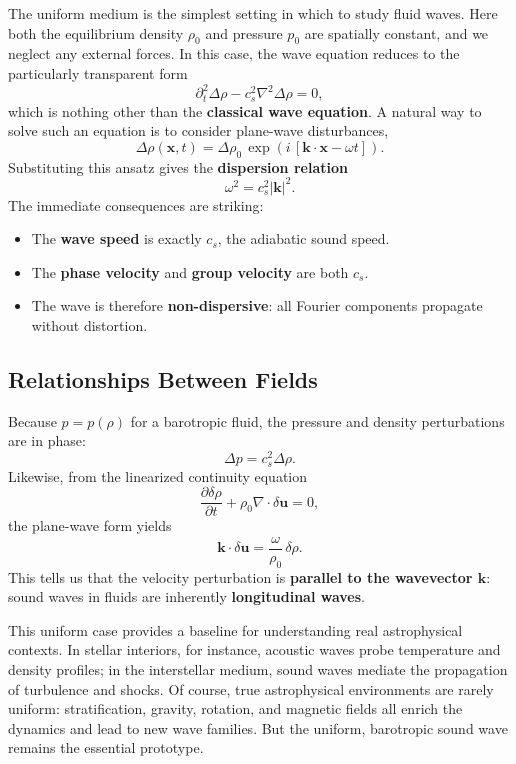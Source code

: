 The uniform medium is the simplest setting in which to study fluid waves.  Here both the equilibrium density $\rho_0$ and pressure $p_0$ are spatially constant, and we neglect any external forces. In this case, the wave equation 
reduces to the particularly transparent form
\[
\partial_t^2 \Delta \rho - c_s^2 \nabla^2 \Delta \rho = 0,
\]
which is nothing other than the \textbf{classical wave equation}.  A natural way to solve such an equation is to consider plane-wave disturbances, 
\[
\Delta \rho(\mathbf{x},t) = \Delta \rho_0 \, 
\exp\!\left(i\,[\mathbf{k}\cdot\mathbf{x} - \omega t]\right).
\]
Substituting this ansatz gives the \textbf{dispersion relation}
\[
\omega^2 = c_s^2 |\mathbf{k}|^2.
\]
The immediate consequences are striking:
\begin{itemize}
    \item The \textbf{wave speed} is exactly $c_s$, the adiabatic sound speed.
    \item The \textbf{phase velocity} and \textbf{group velocity} are both $c_s$.
    \item The wave is therefore \textbf{non-dispersive}: all Fourier components 
    propagate without distortion.
\end{itemize}

\subsection*{Relationships Between Fields}
Because $p=p(\rho)$ for a barotropic fluid, the pressure and density perturbations are in phase:
\[
\Delta p = c_s^2 \Delta \rho.
\]
Likewise, from the linearized continuity equation
\[
\frac{\partial \delta \rho}{\partial t} 
+ \rho_0 \nabla\cdot \delta \mathbf{u} = 0,
\]
the plane-wave form yields
\[
\mathbf{k}\cdot \delta \mathbf{u} = \frac{\omega}{\rho_0}\, \delta \rho.
\]
This tells us that the velocity perturbation is \textbf{parallel to the wavevector $\mathbf{k}$}: sound waves in fluids are inherently \textbf{longitudinal waves}.
\par
This uniform case provides a baseline for understanding real astrophysical 
contexts. In stellar interiors, for instance, acoustic waves probe 
temperature and density profiles; in the interstellar medium, sound waves 
mediate the propagation of turbulence and shocks. Of course, true astrophysical 
environments are rarely uniform: stratification, gravity, rotation, and magnetic 
fields all enrich the dynamics and lead to new wave families. But the uniform, 
barotropic sound wave remains the essential prototype.

